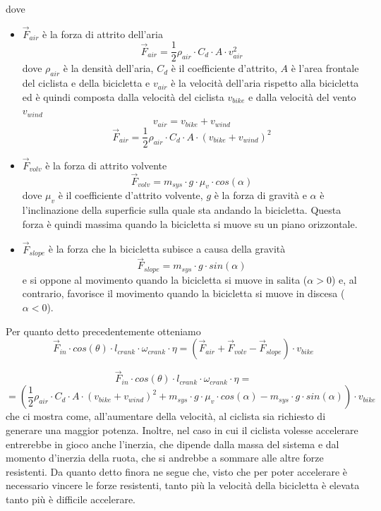 \documentclass[class=article]{standalone}
\begin{document}
	dove	
	\begin{itemize}
		\item \(\vec{F}_{air}\) è la forza di attrito dell'aria
		\[\vec{F}_{air}=\frac{1}{2}\rho_{air}\cdot C_{d}\cdot A\cdot v_{air}^2\]
		dove \(\rho_{air}\) è la densità dell'aria, \(C_{d}\) è il coefficiente d'attrito, \(A\) è l'area frontale del ciclista e della bicicletta e \(v_{air}\) è la velocità dell'aria rispetto alla bicicletta ed è quindi composta dalla velocità del ciclista \(v_{bike}\) e dalla velocità del vento \(v_{wind}\) 
		\[v_{air}=v_{bike}+v_{wind}\]
		\[\vec{F}_{air}=\frac{1}{2}\rho_{air}\cdot C_{d}\cdot A\cdot (v_{bike}+v_{wind})^2\]
		
		\item \(\vec{F}_{volv}\) è la forza di attrito volvente
		\[\vec{F}_{volv}=m_{sys}\cdot g\cdot \mu_{v}\cdot cos(\alpha)\]
		dove \(\mu_{v}\) è il coefficiente d'attrito volvente, \(g\) è la forza di gravità e \(\alpha\) è l'inclinazione della superficie sulla quale sta andando la bicicletta. Questa forza è quindi massima quando la bicicletta si muove su un piano orizzontale.
		
		\item \(\vec{F}_{slope}\) è la forza che la bicicletta subisce a causa della gravità
		\[\vec{F}_{slope}=m_{sys}\cdot g\cdot sin(\alpha)\]
		e si oppone al movimento quando la bicicletta si muove in salita (\(\alpha > 0\)) e, al contrario, favorisce il movimento quando la bicicletta si muove in discesa (\(\alpha < 0\)).
	\end{itemize}
	
	Per quanto detto precedentemente otteniamo
	\[\vec{F}_{in}\cdot cos(\theta)\cdot l_{crank}\cdot \omega_{crank}\cdot\eta=(\vec{F}_{air}+\vec{F}_{volv}-\vec{F}_{slope})\cdot v_{bike}\]
	
	\[\vec{F}_{in}\cdot cos(\theta)\cdot l_{crank}\cdot \omega_{crank}\cdot\eta=\]
	\[=(\frac{1}{2}\rho_{air}\cdot C_{d}\cdot A\cdot (v_{bike}+v_{wind})^2+m_{sys}\cdot g\cdot \mu_{v}\cdot cos(\alpha)-m_{sys}\cdot g\cdot sin(\alpha))\cdot v_{bike}\]
	che ci mostra come, all'aumentare della velocità, al ciclista sia richiesto di generare una maggior potenza. Inoltre, nel caso in cui il ciclista volesse accelerare entrerebbe in gioco anche l'inerzia, che dipende dalla massa del sistema e dal momento d'inerzia della ruota, che si andrebbe a sommare alle altre forze resistenti.
	Da quanto detto finora ne segue che, visto che per poter accelerare è necessario vincere le forze resistenti, tanto più la velocità della bicicletta è elevata tanto più è difficile accelerare.
			
\end{document}
